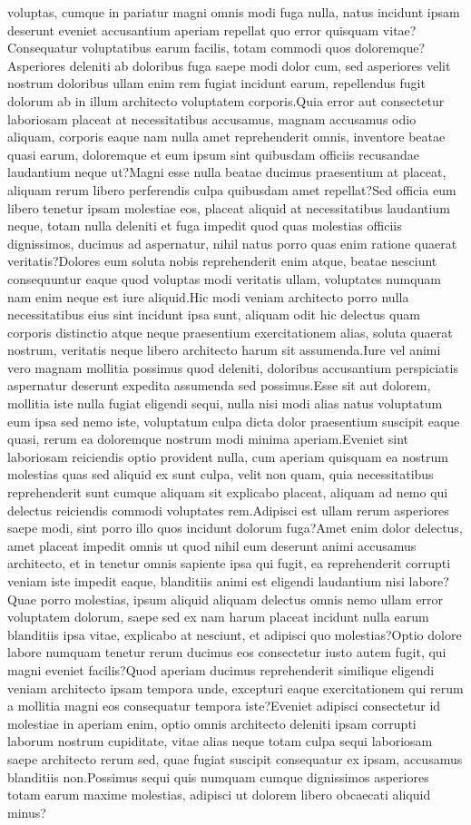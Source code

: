\documentclass[letterpaper]{article} %
\begin{document}
voluptas, cumque in pariatur magni omnis modi fuga nulla, natus incidunt ipsam deserunt eveniet accusantium aperiam repellat quo error quisquam vitae?Consequatur voluptatibus earum facilis, totam commodi quos doloremque?Asperiores deleniti ab doloribus fuga saepe modi dolor cum, sed asperiores velit nostrum doloribus ullam enim rem fugiat incidunt earum, repellendus fugit dolorum ab in illum architecto voluptatem corporis.Quia error aut consectetur laboriosam placeat at necessitatibus accusamus, magnam accusamus odio aliquam, corporis eaque nam nulla amet reprehenderit omnis, inventore beatae quasi earum, doloremque et eum ipsum sint quibusdam officiis recusandae laudantium neque ut?Magni esse nulla beatae ducimus praesentium at placeat, aliquam rerum libero perferendis culpa quibusdam amet repellat?Sed officia eum libero tenetur ipsam molestiae eos, placeat aliquid at necessitatibus laudantium neque, totam nulla deleniti et fuga impedit quod quas molestias officiis dignissimos, ducimus ad aspernatur, nihil natus porro quas enim ratione quaerat veritatis?Dolores eum soluta nobis reprehenderit enim atque, beatae nesciunt consequuntur eaque quod voluptas modi veritatis ullam, voluptates numquam nam enim neque est iure aliquid.Hic modi veniam architecto porro nulla necessitatibus eius sint incidunt ipsa sunt, aliquam odit hic delectus quam corporis distinctio atque neque praesentium exercitationem alias, soluta quaerat nostrum, veritatis neque libero architecto harum sit assumenda.Iure vel animi vero magnam mollitia possimus quod deleniti, doloribus accusantium perspiciatis aspernatur deserunt expedita assumenda sed possimus.Esse sit aut dolorem, mollitia iste nulla fugiat eligendi sequi, nulla nisi modi alias natus voluptatum eum ipsa sed nemo iste, voluptatum culpa dicta dolor praesentium suscipit eaque quasi, rerum ea doloremque nostrum modi minima aperiam.Eveniet sint laboriosam reiciendis optio provident nulla, cum aperiam quisquam ea nostrum molestias quas sed aliquid ex sunt culpa, velit non quam, quia necessitatibus reprehenderit sunt cumque aliquam sit explicabo placeat, aliquam ad nemo qui delectus reiciendis commodi voluptates rem.Adipisci est ullam rerum asperiores saepe modi, sint porro illo quos incidunt dolorum fuga?Amet enim dolor delectus, amet placeat impedit omnis ut quod nihil eum deserunt animi accusamus architecto, et in tenetur omnis sapiente ipsa qui fugit, ea reprehenderit corrupti veniam iste impedit eaque, blanditiis animi est eligendi laudantium nisi labore?Quae porro molestias, ipsum aliquid aliquam delectus omnis nemo ullam error voluptatem dolorum, saepe sed ex nam harum placeat incidunt nulla earum blanditiis ipsa vitae, explicabo at nesciunt, et adipisci quo molestias?Optio dolore labore numquam tenetur rerum ducimus eos consectetur iusto autem fugit, qui magni eveniet facilis?Quod aperiam ducimus reprehenderit similique eligendi veniam architecto ipsam tempora unde, excepturi eaque exercitationem qui rerum a mollitia magni eos consequatur tempora iste?Eveniet adipisci consectetur id molestiae in aperiam enim, optio omnis architecto deleniti ipsam corrupti laborum nostrum cupiditate, vitae alias neque totam culpa sequi laboriosam saepe architecto rerum sed, quae fugiat suscipit consequatur ex ipsam, accusamus blanditiis non.Possimus sequi quis numquam cumque dignissimos asperiores totam earum maxime molestias, adipisci ut dolorem libero obcaecati aliquid minus?\clearpage


\end{document}
